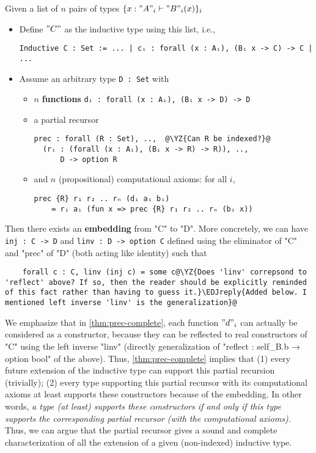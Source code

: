 \begin{theorem}\label{thm:prec-complete} Given a list of $n$ pairs of types $\{ x : "A"_i \vdash "B"_i(x) \}_{i}$
  \begin{itemize}
    \item Define $"C"$ as the inductive type using this list, i.e.,
    \begin{verbatim}
Inductive C : Set := ... | cᵢ : forall (x : Aᵢ), (Bᵢ x -> C) -> C | ...
    \end{verbatim}
    \item Assume an arbitrary type \texttt{D : Set} with
    \begin{itemize}
      \item $n$ \textbf{functions} \texttt{dᵢ : forall (x : Aᵢ), (Bᵢ x -> D) -> D}  
      \item a partial recursor
      \begin{verbatim}
prec : forall (R : Set), ..,  @\YZ{Can R be indexed?}@
  (rᵢ : (forall (x : Aᵢ), (Bᵢ x -> R) -> R)), .., 
      D -> option R
      \end{verbatim}
      \item and $n$ (propositional) computational axioms: for all $i$, 
      \begin{verbatim}
prec {R} r₁ r₂ .. rₙ (dᵢ aᵢ bᵢ) 
    = rᵢ aᵢ (fun x => prec {R} r₁ r₂ .. rₙ (bᵢ x))
      \end{verbatim}
    \end{itemize}
  \end{itemize}
  Then there exists an \textbf{embedding} from "C" to "D".
  More concretely, we can have \texttt{inj : C -> D} and 
  \texttt{linv : D -> option C} defined using the eliminator of
  "C" and "prec" of "D" (both acting like identity) such that
  \begin{verbatim}
    forall c : C, linv (inj c) = some c@\YZ{Does 'linv' correpsond to 'reflect' above? If so, then the reader should be explicitly reminded of this fact rather than having to guess it.}\EDJreply{Added below. I mentioned left inverse 'linv' is the generalization}@
  \end{verbatim}
\end{theorem}

We emphasize that in \cref{thm:prec-complete}, each function $"d"_i$ can
actually be considered as a constructor, because they can be reflected
to real constructors of "C" using the left inverse "linv" (directly generalization of "reflect : self_B.b → option bool" of the above). Thus, \cref{thm:prec-complete}
implies that (1) every future extension of the inductive type can
support this partial recursion (trivially); (2) every type supporting
this partial recursor with its computational axioms at least supports
these constructors because of the embedding. In other words, \textit{a
type (at least) supports these constructors if and only if this type
supports the corresponding partial recursor (with the computational
axioms)}.  Thus, we can argue that the partial recursor gives a sound and
complete characterization of all the extension of a given (non-indexed)
inductive type.

